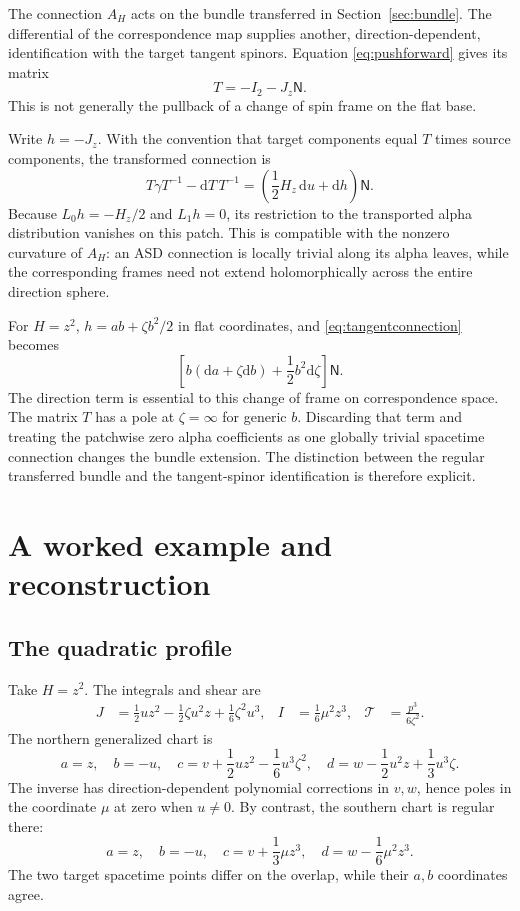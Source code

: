 \documentclass[11pt]{article}
\numberwithin{equation}{section}
\theoremstyle{definition}
\theoremstyle{remark}
\newcommand{\dd}{\mathrm d}
\newcommand{\NN}{\mathsf N}
\newcommand{\II}{I_2}
\newcommand{\calT}{\mathcal T}
\begin{document}
The connection $A_H$ acts on the bundle transferred in Section~\ref{sec:bundle}. The differential of the correspondence map supplies another, direction-dependent, identification with the target tangent spinors. Equation \eqref{eq:pushforward} gives its matrix
\begin{equation}\label{eq:tangentmatrix}
T=-\II-J_z\NN.
\end{equation}
This is not generally the pullback of a change of spin frame on the flat base.

Write $h=-J_z$. With the convention that target components equal $T$ times source components, the transformed connection is
\begin{equation}\label{eq:tangentconnection}
T\gamma T^{-1}-\dd T\,T^{-1}
=\left(\frac12H_z\,\dd u+\dd h\right)\NN.
\end{equation}
Because $L_0h=-H_z/2$ and $L_1h=0$, its restriction to the transported alpha distribution vanishes on this patch. This is compatible with the nonzero curvature of $A_H$: an ASD connection is locally trivial along its alpha leaves, while the corresponding frames need not extend holomorphically across the entire direction sphere.

For $H=z^2$, $h=ab+\zeta b^2/2$ in flat coordinates, and \eqref{eq:tangentconnection} becomes
\begin{equation}\label{eq:tangentquadratic}
\left[b(\dd a+\zeta\dd b)+\frac12b^2\dd\zeta\right]\NN.
\end{equation}
The direction term is essential to this change of frame on correspondence space. The matrix $T$ has a pole at $\zeta=\infty$ for generic $b$. Discarding that term and treating the patchwise zero alpha coefficients as one globally trivial spacetime connection changes the bundle extension. The distinction between the regular transferred bundle and the tangent-spinor identification is therefore explicit.

\section{A worked example and reconstruction}

\subsection{The quadratic profile}

Take $H=z^2$. The integrals and shear are
\begin{align}
J&=\frac12uz^2-\frac12\zeta u^2z+\frac16\zeta^2u^3,
& I&=\frac16\mu^2z^3,
&\calT&=\frac{p^3}{6\zeta^2}.
\label{eq:quadraticdata}
\end{align}
The northern generalized chart is
\begin{equation}\label{eq:quadraticchart}
a=z,\quad b=-u,\quad
c=v+\frac12uz^2-\frac16u^3\zeta^2,\quad
d=w-\frac12u^2z+\frac13u^3\zeta.
\end{equation}
The inverse has direction-dependent polynomial corrections in $v,w$, hence poles in the coordinate $\mu$ at zero when $u\ne0$. By contrast, the southern chart is regular there:
\[
a=z,\quad b=-u,\quad c=v+\frac13\mu z^3,\quad d=w-\frac16\mu^2z^3.
\]
The two target spacetime points differ on the overlap, while their $a,b$ coordinates agree.
\end{document}
